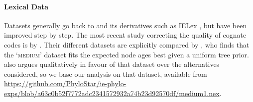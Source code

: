 \documentclass[a4paper,12pt]{scrartcl}
\begin{document}
\paragraph{Lexical Data}
Datasets generally go back to \textcite{dyen1992indoeuropean,dyen1997comparative} and its derivatives such as IELex \parencite{ielex},
but have been improved
step by step. The most recent study correcting
the quality of cognate codes is by \textcite{chang2015ancestryconstrained}. Their different datasets are explicitly compared by \textcite{rama2018three}, who finds that the
‘\textsc{medium}’ dataset fits the expected node ages best given a uniform tree prior.  also argues qualitatively in favour of
that dataset over the alternatives considered, so we base our analysis on that dataset, available from
\url{https://github.com/PhyloStar/ie-phylo-exps/blob/a63c0b52f7772adc2341572932a74b23d92570df/medium1.nex}.
\end{document}
